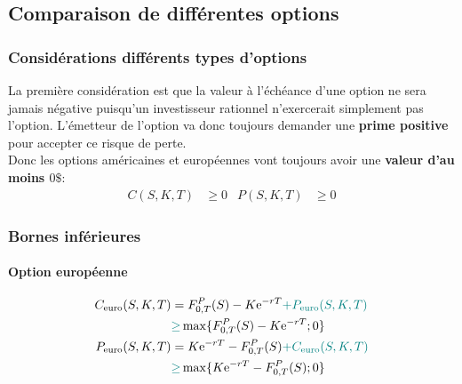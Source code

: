 \documentclass[10pt, french]{article}
\begin{document}
\begin{multicols*}{2}
\columnbreak
\subsection{Comparaison de différentes options}

%
%

\subsubsection*{Considérations différents types d'options}
La première considération est que la valeur à l'échéance d'une option ne sera jamais négative puisqu'un investisseur \og rationnel \fg{} n'exercerait simplement pas l'option. L'émetteur de l'option va donc toujours demander une \textbf{prime positive} pour accepter ce risque de perte.\\

Donc les options américaines et européennes vont toujours avoir une \textbf{valeur d'au moins $0\$$}:
\begin{align*}
	C(S, K, T) &\geq	0	&
	P(S, K, T) &\geq	0	
\end{align*}


\subsubsection*{Bornes inférieures}
\paragraph{Option européenne}
\begin{align*}
	C_{\text{euro}}(S, K, T)	
	&=	F_{0, T}^{P}(S) - K\textrm{e}^{-rT} \textcolor{teal}{+ P_{\text{euro}}(S, K, T)}	\\
	&\textcolor{teal}{\geq}	\max\{F_{0, T}^{P}(S) - K\textrm{e}^{-rT}; 0\}	\\
	P_{\text{euro}}(S, K, T)	
	&=	K\textrm{e}^{-rT} - F_{0, T}^{P}(S) \textcolor{teal}{+ C_{\text{euro}}(S, K, T)}	\\
	&\textcolor{teal}{\geq}	\max\{K\textrm{e}^{-rT} - F_{0, T}^{P}(S); 0\}
\end{align*}


\end{multicols*}
\end{document}
